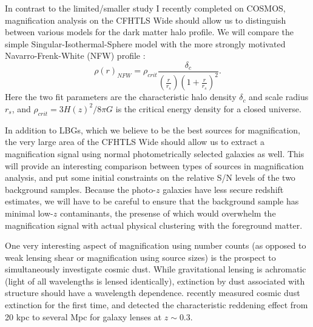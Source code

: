 \documentclass{article}
\begin{document}
In contrast to the limited/smaller study I recently completed on COSMOS, magnification analysis on the CFHTLS Wide should allow us to distinguish between various models for the dark matter halo profile. We will compare the simple Singular-Isothermal-Sphere model with the more strongly motivated Navarro-Frenk-White (NFW) profile \citep{nfw97}:
\begin{equation}
\rho(r)_{NFW}=\rho_{crit}\frac{\delta_c}{(\frac{r}{r_s})(1+\frac{r}{r_s})^2}.
\end{equation}
Here the two fit parameters are the characteristic halo density $\delta_c$ and scale radius $r_s$, and $\rho_{crit}=3H(z)^2/8\pi G$ is the critical energy density for a closed universe.

In addition to LBGs, which we believe to be the best sources for magnification, the very large area of the CFHTLS Wide should allow us to extract a magnification signal using normal photometrically selected galaxies as well. This will provide an interesting comparison between types of sources in magnification analysis, and put some initial constraints on the relative S/N levels of the two background samples. Because the photo-$z$ galaxies have less secure redshift estimates, we will have to be careful to ensure that the background sample has minimal low-$z$ contaminants, the presense of which would overwhelm the magnification signal with actual physical clustering with the foreground matter.

One very interesting aspect of magnification using number counts (as opposed to weak lensing shear or magnification using source sizes) is the prospect to simultaneously investigate cosmic dust. While gravitational lensing is achromatic (light of all wavelengths is lensed identically), extinction by dust associated with structure should have a wavelength dependence. \citet{Menard10} recently measured cosmic dust extinction for the first time, and detected the characteristic reddening effect from 20 kpc to several Mpc for galaxy lenses at $z\sim0.3$. 
\end{document}
